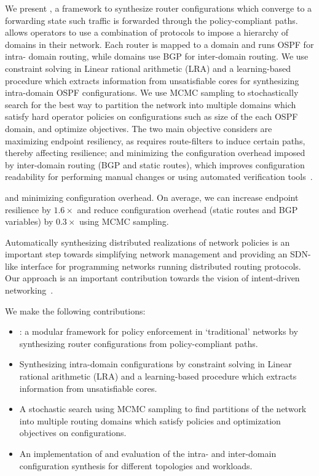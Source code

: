 We present \name, 
a framework to synthesize router configurations which 
converge to a forwarding state such traffic is
forwarded through the policy-compliant paths. 
\name allows operators to use a combination of 
protocols to impose a hierarchy of domains in their network.
Each router is mapped to a domain and runs OSPF for intra-
domain routing, while domains use BGP for inter-domain
routing. We use constraint solving in Linear rational 
arithmetic (LRA) and a learning-based procedure which 
extracts information from unsatisfiable cores 
for synthesizing intra-domain OSPF configurations. 
We use MCMC sampling to stochastically search for 
the best way to partition the network into multiple 
domains which satisfy hard operator policies on configurations
such as size of the each OSPF domain, and optimize objectives.
The two main objective \name considers are 
maximizing endpoint resiliency, as \name requires
route-filters to induce certain paths, thereby affecting resilience; 
and minimizing the configuration overhead imposed by 
inter-domain routing (BGP and static routes), which 
improves configuration readability for performing manual changes 
or using automated verification tools~\cite{batfish, arc, era}.

and minimizing configuration 
overhead. On average, we can increase endpoint resilience
by $1.6\times$ and reduce configuration overhead (static routes
and BGP variables) by $0.3\times$ using MCMC sampling. 


Automatically synthesizing distributed realizations 
of network policies is an
important step towards simplifying 
network management and providing an 
SDN-like interface for programming networks 
running distributed routing protocols. 
Our approach is an important
contribution towards the vision of 
intent-driven networking~\cite{intent}.


 We make the following contributions:
\begin{itemize}
	\item \name: a modular framework 
	for policy enforcement in `traditional' networks
	by synthesizing router configurations from policy-compliant paths. 
	\item Synthesizing intra-domain configurations by
	constraint solving in Linear rational arithmetic (LRA) and 
	a learning-based procedure which extracts information from 
	unsatisfiable cores. 
	\item A stochastic search using MCMC sampling to find 
	partitions of the network into multiple routing domains which
	satisfy policies and optimization objectives on configurations.
	\item An implementation of \name and evaluation of the 
	intra- and inter-domain configuration synthesis for different
	topologies and workloads. 
\end{itemize}